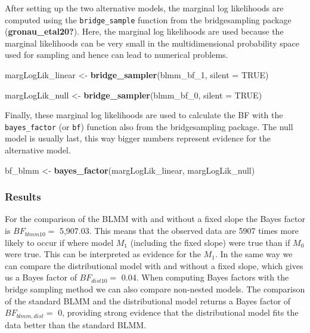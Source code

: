 \documentclass[
  doc,12pt,floatsintext]{apa7}
\newenvironment{Shaded}{\begin{snugshade}}{\end{snugshade}}
\newcommand{\AttributeTok}[1]{\textcolor[rgb]{0.13,0.29,0.53}{#1}}
\newcommand{\ConstantTok}[1]{\textcolor[rgb]{0.56,0.35,0.01}{#1}}
\newcommand{\FunctionTok}[1]{\textcolor[rgb]{0.13,0.29,0.53}{\textbf{#1}}}
\newcommand{\NormalTok}[1]{#1}
\newcommand{\OtherTok}[1]{\textcolor[rgb]{0.56,0.35,0.01}{#1}}
\begin{document}
After setting up the two alternative models, the marginal log likelihoods are computed using the \texttt{bridge\_sample} function from the bridgesampling package (\textbf{gronau\_etal20?}). Here, the marginal log likelihoods are used because the marginal likelihoods can be very small in the multidimensional probability space used for sampling and hence can lead to numerical problems.

\begin{Shaded}
\begin{Highlighting}[]
\NormalTok{margLogLik\_linear }\OtherTok{\textless{}{-}} \FunctionTok{bridge\_sampler}\NormalTok{(blmm\_bf\_1, }\AttributeTok{silent =} \ConstantTok{TRUE}\NormalTok{)}

\NormalTok{margLogLik\_null }\OtherTok{\textless{}{-}} \FunctionTok{bridge\_sampler}\NormalTok{(blmm\_bf\_0, }\AttributeTok{silent =} \ConstantTok{TRUE}\NormalTok{)}
\end{Highlighting}
\end{Shaded}

Finally, these marginal log likelihoods are used to calculate the BF with the \texttt{bayes\_factor} (or \texttt{bf}) function also from the bridgesampling package. The null model is usually last, this way bigger numbers represent evidence for the alternative model.

\begin{Shaded}
\begin{Highlighting}[]
\NormalTok{bf\_blmm }\OtherTok{\textless{}{-}} \FunctionTok{bayes\_factor}\NormalTok{(margLogLik\_linear, margLogLik\_null)}
\end{Highlighting}
\end{Shaded}

\subsubsection{Results}\label{results-3}

For the comparison of the BLMM with and without a fixed slope the Bayes factor is \(BF_{blmm10} =\) 5,907.03. This means that the observed data are 5907 times more likely to occur if where model \(M_1\) (including the fixed slope) were true than if \(M_0\) were true. This can be interpreted as evidence for the \(M_1\). In the same way we can compare the distributional model with and without a fixed slope, which gives us a Bayes factor of \(BF_{dist10} =\) 0.04. When computing Bayes factors with the bridge sampling method we can also compare non-nested models. The comparison of the standard BLMM and the distributional model returns a Bayes factor of \(BF_{blmm,dist} =\) 0, providing strong evidence that the distributional model fits the data better than the standard BLMM.
\end{document}
